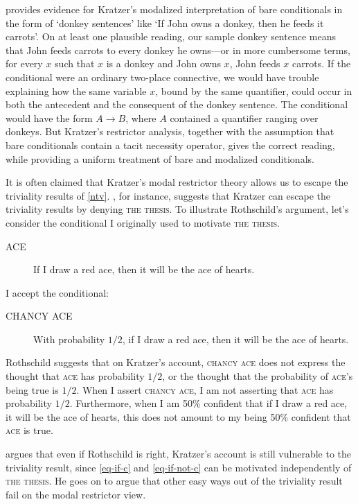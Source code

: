 \citet{heim-thesis} provides evidence for Kratzer's modalized interpretation of bare conditionals in the form of `donkey sentences' like `If John owns a donkey, then he feeds it carrots'.  On at least one plausible reading, our sample donkey sentence means that John feeds carrots to every donkey he owns---or in more cumbersome terms, for every $x$ such that $x$ is a donkey and John owns $x$, John feeds $x$ carrots.  If the conditional were an ordinary two-place connective, we would have trouble explaining how the same variable $x$, bound by the same quantifier, could occur in both the antecedent and the consequent of the donkey sentence.  The conditional would have the form $A \rightarrow B$, where $A$ contained a quantifier ranging over donkeys.  But Kratzer's restrictor analysis, together with the assumption that bare conditionals contain a tacit necessity operator, gives the correct reading, while providing a uniform treatment of bare and modalized conditionals.

It is often claimed that Kratzer's modal restrictor theory allows us to escape the triviality results of \autoref{ntv}. \citet{rothschild-kratzer}, for instance, suggests that Kratzer can escape the triviality results by denying \textsc{the thesis}.  To illustrate Rothschild's argument, let's consider the conditional I originally used to motivate \textsc{the thesis}.
\begin{description}
\item[ACE] If I draw a red ace, then it will be the ace of hearts.
\end{description}
I accept the conditional:
\begin{description}
\item[CHANCY ACE] With probability $1/2$, if I draw a red ace, then it will be the ace of hearts.
\end{description}
Rothschild suggests that on Kratzer's account, \textsc{chancy ace} does not express the thought that \textsc{ace} has probability $1/2$, or the thought that the probability of \textsc{ace}'s being true is $1/2$.  When I assert \textsc{chancy ace}, I am not asserting that \textsc{ace} has probability $1/2$.  Furthermore, when I am 50\% confident that if I draw a red ace, it will be the ace of hearts, this does not amount to my being 50\% confident that \textsc{ace} is true.

 \citet{charlow-trivial} argues that even if Rothschild is right, Kratzer's account is still vulnerable to the triviality result, since \autoref{eq-if-c} and \autoref{eq-if-not-c} can be motivated independently of \textsc{the thesis}.  He goes on to argue that other easy ways out of the triviality result fail on the modal restrictor view.

